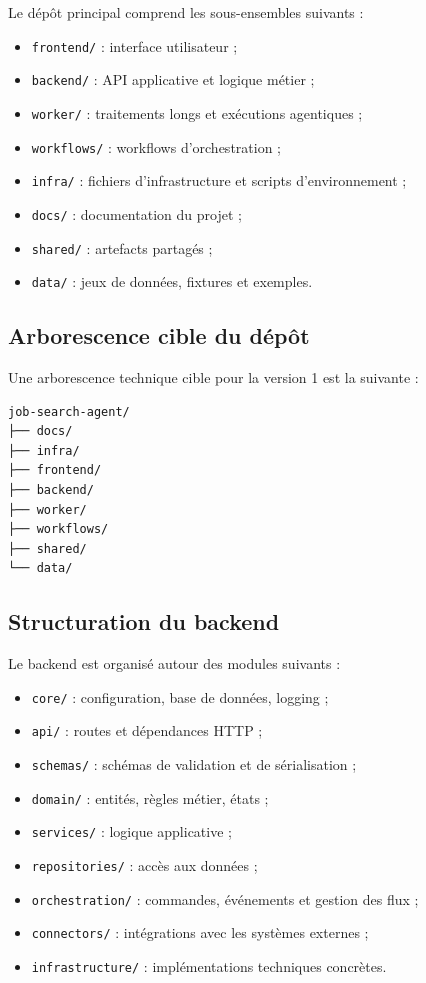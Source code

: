 \documentclass[11pt,a4paper]{article}
\begin{document}
Le dépôt principal comprend les sous-ensembles suivants :

\begin{itemize}
    \item \texttt{frontend/} : interface utilisateur ;
    \item \texttt{backend/} : API applicative et logique métier ;
    \item \texttt{worker/} : traitements longs et exécutions agentiques ;
    \item \texttt{workflows/} : workflows d’orchestration ;
    \item \texttt{infra/} : fichiers d’infrastructure et scripts d’environnement ;
    \item \texttt{docs/} : documentation du projet ;
    \item \texttt{shared/} : artefacts partagés ;
    \item \texttt{data/} : jeux de données, fixtures et exemples.
\end{itemize}

\subsection{Arborescence cible du dépôt}

Une arborescence technique cible pour la version 1 est la suivante :

\begin{verbatim}
job-search-agent/
├── docs/
├── infra/
├── frontend/
├── backend/
├── worker/
├── workflows/
├── shared/
└── data/
\end{verbatim}

\subsection{Structuration du backend}

Le backend est organisé autour des modules suivants :

\begin{itemize}
    \item \texttt{core/} : configuration, base de données, logging ;
    \item \texttt{api/} : routes et dépendances HTTP ;
    \item \texttt{schemas/} : schémas de validation et de sérialisation ;
    \item \texttt{domain/} : entités, règles métier, états ;
    \item \texttt{services/} : logique applicative ;
    \item \texttt{repositories/} : accès aux données ;
    \item \texttt{orchestration/} : commandes, événements et gestion des flux ;
    \item \texttt{connectors/} : intégrations avec les systèmes externes ;
    \item \texttt{infrastructure/} : implémentations techniques concrètes.
\end{itemize}
\end{document}
